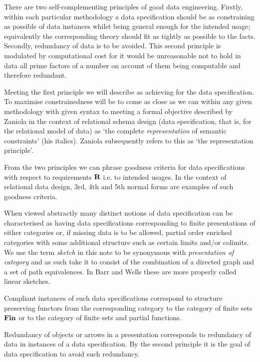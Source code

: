 \note 
There are two self-complementing principles of good data engineering. Firstly, within each particular methodology a data specification should be as constraining as possible of data instances whilst being general enough for the intended usage; equivalently the corresponding theory should fit as tightly as possible to the facts. Secondly, redundancy of data is to be avoided. This second principle is modulated by computational cost for it would be unreasonable not to hold in data all prime factors of a number on account of them being computable and therefore redundant.

\note 
Meeting the first principle we will describe as achieving  for the data specification.
To maximise constrainedness will be to come as  close as we can within any given methodology with given syntax to meeting a formal objective described by Zaniola \cite{zaniolo1982} in the context of relational schema design (data specification, that is, for the relational model of data)  as `the complete \textit{representation} of semantic constraints' (his italics). Zaniola subsequently refers to this as `the representation principle'.

\note
From the two principles we can phrase goodness criteria  for data specifications with respect to requirements $\textbf{R}$
i.e. to intended usages. In the context of relational data design, 3rd, 4th and 5th normal forms are examples of such goodness criteria. 

\note
When viewed abstractly many distinct notions of data specification can be characterised as having
data specifications corresponding to finite presentations of either categories or, if missing data is to be allowed, partial order enriched categories with some additional structure such as certain limits and/or colimits. We use the term \textit{sketch}
in this note to be synonymous with \textit{presentation of category} and as such take it to consist of the combination of a directed graph and a set of path equivalences. In Barr and Wells \cite{BarrandWells} these are more properly called linear sketches.  

\note
Compliant instances of such data specifications correspond to structure preserving functors from the corresponding category to the category of finite sets $\textbf{Fin}$ or to the category of finite sets and partial functions.

\note
Redundancy of objects or arrows in a presentation corresponds to redundancy of data in instances of a data specification. 
By the second principle it is the goal of data specification to avoid such redundancy. 

